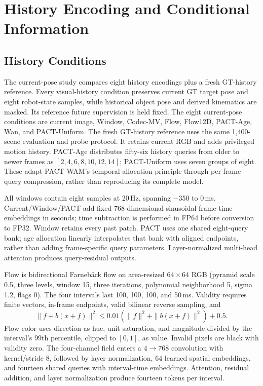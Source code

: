 \section{History Encoding and Conditional Information}
\label{app:q1}

\subsection{History Conditions}
The current-pose study compares eight history encodings plus a fresh
GT-history reference. Every visual-history condition preserves current GT
target pose and eight robot-state samples, while historical object pose
and derived kinematics are masked. Its reference future supervision is held
fixed. The eight current-pose conditions are current image, Window,
Codec-MV, Flow, Flow12D, PACT-Age, Wan, and PACT-Uniform.
The fresh GT-history reference uses the same 1,400-scene evaluation and
probe protocol. It retains current RGB and adds privileged motion history.
PACT-Age distributes fifty-six history queries from older to newer frames
as $[2,4,6,8,10,12,14]$; PACT-Uniform uses seven groups of eight.
These adapt PACT-WAM's temporal allocation principle \cite{pactwam} through
per-frame query compression, rather than reproducing its complete model.


All windows contain eight samples at 20\,Hz, spanning $-350$ to 0\,ms.
Current/Window/PACT add fixed 768-dimensional sinusoidal frame-time
embeddings in seconds; time subtraction is performed in FP64 before
conversion to FP32. Window retains every past patch. PACT uses one shared
eight-query bank; age allocation linearly interpolates that bank with aligned
endpoints, rather than adding frame-specific query parameters.
Layer-normalized multi-head attention produces query-residual outputs.

Flow is bidirectional Farneb\"ack flow \cite{farneback} on area-resized $64\times64$ RGB
(pyramid scale 0.5, three levels, window 15, three iterations,
polynomial neighborhood 5, sigma 1.2, flags 0). The four intervals last
100, 100, 100, and 50\,ms. Validity requires finite vectors, in-frame
endpoints, valid bilinear reverse sampling, and
\begin{equation}
\|f+b(x+f)\|^2\leq0.01(\|f\|^2+\|b(x+f)\|^2)+0.5 .
\end{equation}
Flow color uses direction as hue, unit saturation, and magnitude divided
by the interval's 99th percentile, clipped to $[0,1]$, as value. Invalid
pixels are black with validity zero. The four-channel field enters a
$4\to768$ convolution with kernel/stride 8, followed by layer normalization,
64 learned spatial embeddings, and fourteen shared queries with interval-time
embeddings. Attention, residual addition, and layer normalization produce
fourteen tokens per interval.

